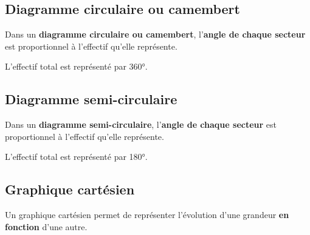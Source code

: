 \subsection{Diagramme circulaire ou camembert}
\vspace*{-15mm}
\begin{minipage}{0.8\linewidth}
   \begin{definition}
      Dans un \textbf{diagramme circulaire ou camembert}, l'\textbf{angle de chaque secteur} est proportionnel à l'effectif qu'elle repr\'esente.

      L'effectif total est représenté par \ang{360}.   
   \end{definition}
\end{minipage}
\hspace*{-15mm}
\begin{minipage}{0.2\linewidth}
   \begin{center}
   \end{center}
\end{minipage}

\subsection{Diagramme semi-circulaire}
\begin{minipage}{0.8\linewidth}
   \begin{definition}
   Dans un \textbf{diagramme semi-circulaire}, l'\textbf{angle de chaque secteur} est proportionnel à l'effectif qu'elle repr\'esente.
   \par
   L'effectif total est représenté par \ang{180}.
   \end{definition}
\end{minipage}
\hspace*{-15mm}
\begin{minipage}{0.2\linewidth}
   \begin{center}
   \end{center}
\end{minipage}
   
\subsection{Graphique cartésien}
\begin{definition}
Un graphique cart\'esien permet de repr\'esenter l'\'evolution d'une grandeur \textbf{en fonction} d'une autre.
\end{definition}
\begin{exemple*1}

   \begin{center}      
   \end{center}
\end{exemple*1}